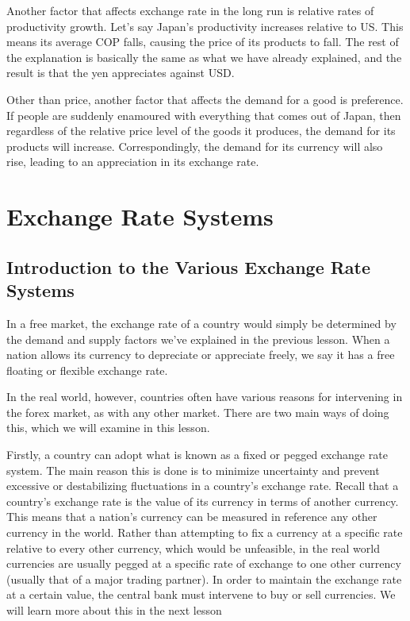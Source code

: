Another factor that affects exchange rate in the long run is relative rates of productivity growth. Let's say Japan's productivity increases relative to US. This means its average COP falls, causing the price of its products to fall. The rest of the explanation is basically the same as what we have already explained, and the result is that the yen appreciates against USD.

Other than price, another factor that affects the demand for a good is preference. If people are suddenly enamoured with everything that comes out of Japan, then regardless of the relative price level of the goods it produces, the demand for its products will increase. Correspondingly, the demand for its currency will also rise, leading to an appreciation in its exchange rate.
\section{Exchange Rate Systems}
\subsection{Introduction to the Various Exchange Rate Systems}
In a free market, the exchange rate of a country would simply be determined by the demand and supply factors we've explained in the previous lesson. When a nation allows its currency to depreciate or appreciate freely, we say it has a free floating or flexible exchange rate.

In the real world, however, countries often have various reasons for intervening in the forex market, as with any other market. There are two main ways of doing this, which we will examine in this lesson.

Firstly, a country can adopt what is known as a fixed or pegged exchange rate system. The main reason this is done is to minimize uncertainty and prevent excessive or destabilizing fluctuations in a country's exchange rate. Recall that a country's exchange rate is the value of its currency in terms of another currency. This means that a nation's currency can be measured in reference any other currency in the world. Rather than attempting to fix a currency at a specific rate relative to every other currency, which would be unfeasible, in the real world currencies are usually pegged at a specific rate of exchange to one other currency (usually that of a major trading partner). In order to maintain the exchange rate at a certain value, the central bank must intervene to buy or sell currencies. We will learn more about this in the next lesson

